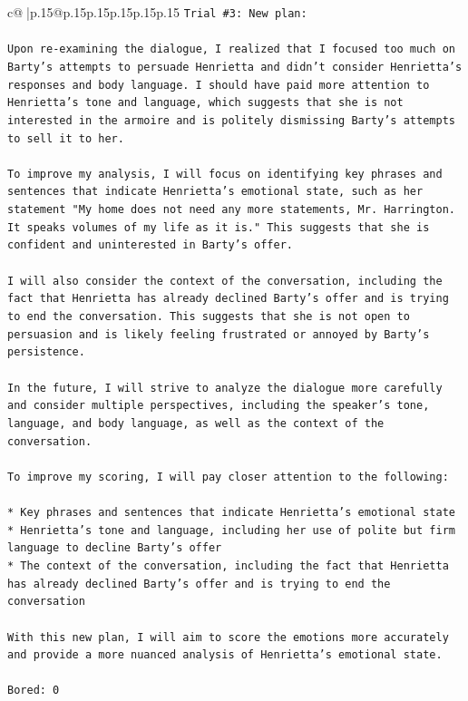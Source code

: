 \documentclass{article}
\begin{document}
{\begin{supertabular}{c@{$\;$}|p{.15\linewidth}@{}p{.15\linewidth}p{.15\linewidth}p{.15\linewidth}p{.15\linewidth}p{.15\linewidth}}
{{{\texttt{Trial \#3: New plan: } \\
\\ 
\texttt{Upon re{-}examining the dialogue, I realized that I focused too much on Barty's attempts to persuade Henrietta and didn't consider Henrietta's responses and body language. I should have paid more attention to Henrietta's tone and language, which suggests that she is not interested in the armoire and is politely dismissing Barty's attempts to sell it to her.} \\
\\ 
\texttt{To improve my analysis, I will focus on identifying key phrases and sentences that indicate Henrietta's emotional state, such as her statement "My home does not need any more statements, Mr. Harrington. It speaks volumes of my life as it is." This suggests that she is confident and uninterested in Barty's offer.} \\
\\ 
\texttt{I will also consider the context of the conversation, including the fact that Henrietta has already declined Barty's offer and is trying to end the conversation. This suggests that she is not open to persuasion and is likely feeling frustrated or annoyed by Barty's persistence.} \\
\\ 
\texttt{In the future, I will strive to analyze the dialogue more carefully and consider multiple perspectives, including the speaker's tone, language, and body language, as well as the context of the conversation.} \\
\\ 
\texttt{To improve my scoring, I will pay closer attention to the following:} \\
\\ 
\texttt{* Key phrases and sentences that indicate Henrietta's emotional state} \\
\texttt{* Henrietta's tone and language, including her use of polite but firm language to decline Barty's offer} \\
\texttt{* The context of the conversation, including the fact that Henrietta has already declined Barty's offer and is trying to end the conversation} \\
\\ 
\texttt{With this new plan, I will aim to score the emotions more accurately and provide a more nuanced analysis of Henrietta's emotional state.} \\
\\ 
\texttt{Bored: 0} \\
}}}
\end{supertabular}}
\end{document}
